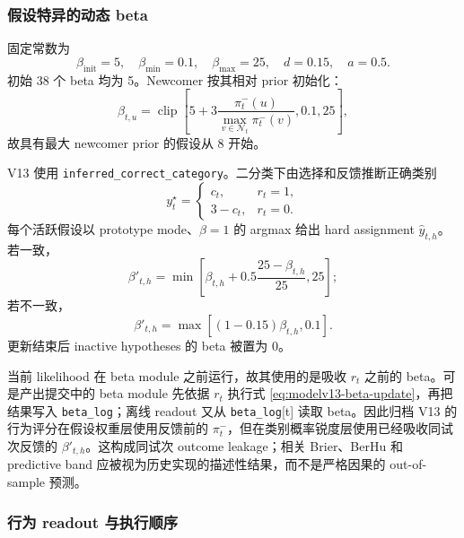 \subsubsection{假设特异的动态 beta}

固定常数为
\begin{equation}
    \beta_{\mathrm{init}}=5,
    \quad\beta_{\min}=0.1,
    \quad\beta_{\max}=25,
    \quad d=0.15,
    \quad a=0.5.
    \label{eq:modelv13-beta-constants}
\end{equation}
初始 38 个 beta 均为 5。Newcomer 按其相对 prior 初始化：
\begin{equation}
    \beta_{t,u}=\operatorname{clip}\!\left[
    5+3\frac{\pi_t^-(u)}{\max_{v\in\mathcal N_t}\pi_t^-(v)},
    0.1,25
    \right],
    \label{eq:modelv13-newcomer-beta}
\end{equation}
故具有最大 newcomer prior 的假设从 8 开始。

V13 使用 \texttt{inferred\_correct\_category}。二分类下由选择和反馈推断正确类别
\begin{equation}
    y_t^\star=\begin{cases}c_t,&r_t=1,\\3-c_t,&r_t=0.\end{cases}
\end{equation}
每个活跃假设以 prototype mode、$\beta=1$ 的 argmax 给出 hard assignment $\widehat y_{t,h}$。若一致，
\begin{equation}
    \beta'_{t,h}=\min\!\left[
    \beta_{t,h}+0.5\frac{25-\beta_{t,h}}{25},25
    \right];
\end{equation}
若不一致，
\begin{equation}
    \beta'_{t,h}=\max[(1-0.15)\beta_{t,h},0.1].
    \label{eq:modelv13-beta-update}
\end{equation}
更新结束后 inactive hypotheses 的 beta 被置为 0。

当前 likelihood 在 beta module 之前运行，故其使用的是吸收 $r_t$ 之前的 beta。可是产出提交中的 beta module 先依据 $r_t$ 执行式 \ref{eq:modelv13-beta-update}，再把结果写入 \texttt{beta\_log}；离线 readout 又从 \texttt{beta\_log}[t] 读取 beta。因此归档 V13 的行为评分在假设权重层使用反馈前的 $\pi_t^-$，但在类别概率锐度层使用已经吸收同试次反馈的 $\beta'_{t,h}$。这构成同试次 outcome leakage；相关 Brier、BerHu 和 predictive band 应被视为历史实现的描述性结果，而不是严格因果的 out-of-sample 预测。


\subsubsection{行为 readout 与执行顺序}

